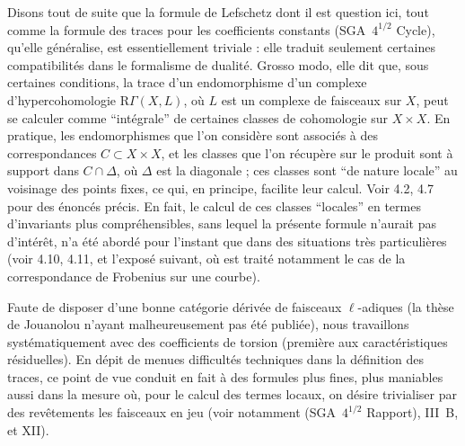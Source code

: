 \documentclass[11pt]{article}
\newcommand{\R}{\mathrm{R}}\newcommand{\RHomCore}{\mathrm{RHom}}
\providecommand{\R}{\mathrm R}
\begin{document}
Disons tout de suite que la formule de Lefschetz dont il est question ici, tout comme la formule des traces pour les coefficients constants (SGA~$4^{1/2}$ Cycle), qu'elle généralise, est essentiellement triviale : elle traduit seulement certaines compatibilités dans le formalisme de dualité. Grosso modo, elle dit que, sous certaines conditions, la trace d'un endomorphisme d'un complexe d'hypercohomologie $\R\Gamma(X,L)$, où $L$ est un complexe de faisceaux sur $X$, peut se calculer comme ``intégrale'' de certaines classes de cohomologie sur $X \times X$. En pratique, les endomorphismes que l'on considère sont associés à des correspondances $C \subset X \times X$, et les classes que l'on récupère sur le produit sont à support dans $C \cap \Delta$, où $\Delta$ est la diagonale ; ces classes sont ``de nature locale'' au voisinage des points fixes, ce qui, en principe, facilite leur calcul. Voir 4.2, 4.7 pour des énoncés précis. En fait, le calcul de ces classes ``locales'' en termes d'invariants plus compréhensibles, sans lequel la présente formule n'aurait pas d'intérêt, n'a été abordé pour l'instant que dans des situations très particulières (voir 4.10, 4.11, et l'exposé suivant, où est traité notamment le cas de la correspondance de Frobenius sur une courbe).

Faute de disposer d'une bonne catégorie dérivée de faisceaux $\ell$-adiques (la thèse de Jouanolou n'ayant malheureusement pas été publiée), nous travaillons systématiquement avec des coefficients de torsion (première aux caractéristiques résiduelles). En dépit de menues difficultés techniques dans la définition des traces, ce point de vue conduit en fait à des formules plus fines, plus maniables aussi dans la mesure où, pour le calcul des termes locaux, on désire trivialiser par des revêtements les faisceaux en jeu (voir notamment (SGA~$4^{1/2}$ Rapport), III~B, et XII).
\end{document}

